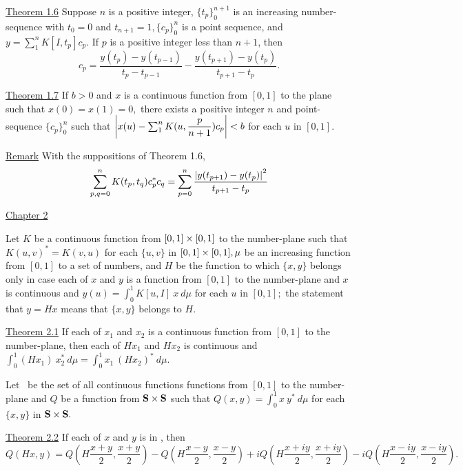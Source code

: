 \underline{Theorem 1.6}  Suppose $n$ is a positive integer, $\{t_{p}\}_{0}^{n+1}$ is an increasing number-sequence with $t_{0} = 0$ and $t_{n+1} = 1, \{c_{p}\}_{0}^{{n}}$ is a point sequence, and  $y = \sum_{1}^{n} K[I,t_{p}]c_{p}.$   If $p$ is a positive integer less than $n + 1$, then \nl
\[
c_{p} = \dfrac{y(t_{p}) - y(t_{p-1})}{t_{p} - t_{p-1}} - \dfrac{y(t_{p+1}) - y(t_{p})}{t_{p+1} - t_{p}}.
\]

\underline{Theorem 1.7}  If $b > 0$ and $x$ is a continuous function from $[0, 1]$ to the plane such that $x(0) = x(1) = 0,$ there exists a positive integer $n$ and  point-sequence $\{c_{p}\}_{0}^{n}$ such that $\left|x(u) - \sum_{1}^{n} K(u,\dfrac{p}{n+1})c_{p}\right| < b$ for each $u$ in $[0,1].$  \nl

\underline{Remark}  With the suppositions of Theorem 1.6, \nl
\[
\sum_{p,q = 0}^{n} K(t_{p},t_{q})c^{*}_{p}c_{q} = \sum_{p=0}^{n} \dfrac{\left|y(t_{p+1}) - y(t_{p})\right|^{2}}{t_{p+1} - t_{p}}
\]



\np
\begin{center}
\underline{Chapter 2}
\end{center}

Let $K$ be a continuous function from $[0, 1] \times [0, 1]$ to the number-plane such that $K(u, v)^{*} = K(v,u)$ for each $\{u, v\}$ in $[0, 1] \times [0, 1], \mu $ be an increasing function from $[0, 1]$ to a set of numbers, and $H$ be the function to which $\{x, y\}$ belongs only in case each of $x$ and $y$ is a function from $[0, 1]$ to the number-plane and $x$ is continuous and $y(u) = \int_{0}^{1}K[u, I]~x~d\mu$ for each $u$ in $[0, 1];$ the statement that $y= Hx$ means that $\{x, y\}$ belongs to $H$.  \nl

\underline{Theorem 2.1}  If each of $x_{1}$ and $x_{2}$ is a continuous function from $[0, 1]$ to the number-plane, then each of $Hx_{1}$ and $Hx_{2}$ is continuous and $\int_{0}^{1}(Hx_{1})~x_{2}^{*}~d\mu =\int_{0}^{1} x_{1}~(Hx_{2})^{*}~d\mu.$ \nl

Let \bs~be the set of all continuous functions functions from $[0, 1]$ to the number-plane and $Q$ be a function from $\textbf{S} \times \textbf{S}$ such that $Q(x, y) = \int_{0}^{1}x~y^{*}~d\mu$ for each $\{x, y\}$ in $\textbf{S} \times \textbf{S} .$ \nl

\underline{Theorem 2.2}  If each of $x$ and $y$ is in \bs, then \nl
\[
Q(Hx,y) = Q\left(H\dfrac{x+y}{2}, \dfrac{x+y}{2}\right) - Q\left(H\dfrac{x-y}{2},\dfrac{x-y}{2}\right) + iQ\left(H\dfrac{x+iy}{2},\dfrac{x+iy}{2}\right) - iQ\left(H\dfrac{x-iy}{2}, \dfrac{x-iy}{2}\right).
\]


